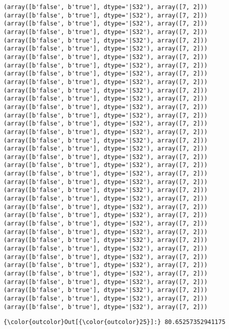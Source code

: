 \documentclass[11pt]{article}
\begin{document}
\begin{Verbatim}[commandchars=\\\{\}]
(array([b'false', b'true'], dtype='|S32'), array([7, 2]))
(array([b'false', b'true'], dtype='|S32'), array([7, 2]))
(array([b'false', b'true'], dtype='|S32'), array([7, 2]))
(array([b'false', b'true'], dtype='|S32'), array([7, 2]))
(array([b'false', b'true'], dtype='|S32'), array([7, 2]))
(array([b'false', b'true'], dtype='|S32'), array([7, 2]))
(array([b'false', b'true'], dtype='|S32'), array([7, 2]))
(array([b'false', b'true'], dtype='|S32'), array([7, 2]))
(array([b'false', b'true'], dtype='|S32'), array([7, 2]))
(array([b'false', b'true'], dtype='|S32'), array([7, 2]))
(array([b'false', b'true'], dtype='|S32'), array([7, 2]))
(array([b'false', b'true'], dtype='|S32'), array([7, 2]))
(array([b'false', b'true'], dtype='|S32'), array([7, 2]))
(array([b'false', b'true'], dtype='|S32'), array([7, 2]))
(array([b'false', b'true'], dtype='|S32'), array([7, 2]))
(array([b'false', b'true'], dtype='|S32'), array([7, 2]))
(array([b'false', b'true'], dtype='|S32'), array([7, 2]))
(array([b'false', b'true'], dtype='|S32'), array([7, 2]))
(array([b'false', b'true'], dtype='|S32'), array([7, 2]))
(array([b'false', b'true'], dtype='|S32'), array([7, 2]))
(array([b'false', b'true'], dtype='|S32'), array([7, 2]))
(array([b'false', b'true'], dtype='|S32'), array([7, 2]))
(array([b'false', b'true'], dtype='|S32'), array([7, 2]))
(array([b'false', b'true'], dtype='|S32'), array([7, 2]))
(array([b'false', b'true'], dtype='|S32'), array([7, 2]))
(array([b'false', b'true'], dtype='|S32'), array([7, 2]))
(array([b'false', b'true'], dtype='|S32'), array([7, 2]))
(array([b'false', b'true'], dtype='|S32'), array([7, 2]))
(array([b'false', b'true'], dtype='|S32'), array([7, 2]))
(array([b'false', b'true'], dtype='|S32'), array([7, 2]))
(array([b'false', b'true'], dtype='|S32'), array([7, 2]))
(array([b'false', b'true'], dtype='|S32'), array([7, 2]))
(array([b'false', b'true'], dtype='|S32'), array([7, 2]))
(array([b'false', b'true'], dtype='|S32'), array([7, 2]))
(array([b'false', b'true'], dtype='|S32'), array([7, 2]))
(array([b'false', b'true'], dtype='|S32'), array([7, 2]))
(array([b'false', b'true'], dtype='|S32'), array([7, 2]))

    \end{Verbatim}

\begin{Verbatim}[commandchars=\\\{\}]
{\color{outcolor}Out[{\color{outcolor}25}]:} 80.65257352941175
\end{Verbatim}
            

    
    
    
    
\end{document}
